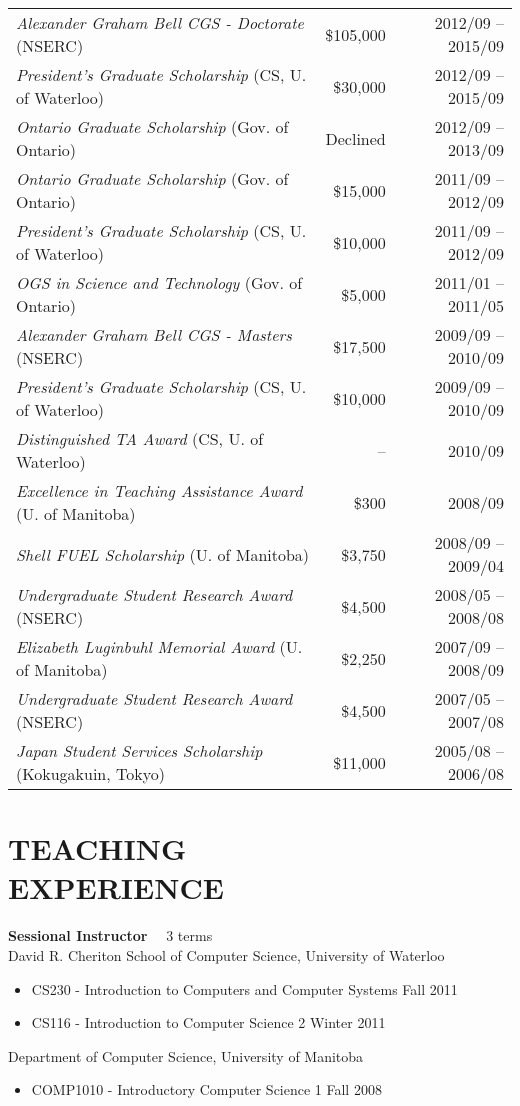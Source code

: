 \documentclass[line,margin]{res}
\begin{document}
\begin{resume}
\begin{tabular}{lrr}
{\sl Alexander Graham Bell CGS - Doctorate} (NSERC) &
\$105,000 & 2012/09 -- 2015/09 \\
{\sl President's Graduate Scholarship} (CS, U. of Waterloo) &
\$30,000 & 2012/09 -- 2015/09 \\
{\sl Ontario Graduate Scholarship} (Gov. of Ontario) & 
Declined & 2012/09 -- 2013/09 \\
{\sl Ontario Graduate Scholarship} (Gov. of Ontario) &
\$15,000 & 2011/09 -- 2012/09 \\
{\sl President's Graduate Scholarship} (CS, U. of Waterloo) &
\$10,000 & 2011/09 -- 2012/09 \\
{\sl OGS in Science and Technology} (Gov. of Ontario) &
\$5,000 & 2011/01 -- 2011/05 \\
{\sl Alexander Graham Bell CGS - Masters} (NSERC) &
\$17,500 & 2009/09 -- 2010/09 \\
{\sl President's Graduate Scholarship} (CS, U. of Waterloo) &
\$10,000 & 2009/09 -- 2010/09 \\
{\sl Distinguished TA Award} (CS, U. of Waterloo) &
-- & 2010/09 \\
{\sl Excellence in Teaching Assistance Award} (U. of Manitoba) &
\$300 & 2008/09 \\
{\sl Shell FUEL Scholarship} (U. of Manitoba) &
\$3,750 & 2008/09 -- 2009/04 \\
{\sl Undergraduate Student Research Award} (NSERC) &
\$4,500 & 2008/05 -- 2008/08 \\
{\sl Elizabeth Luginbuhl Memorial Award} (U. of Manitoba) &
\$2,250 & 2007/09 -- 2008/09 \\
{\sl Undergraduate Student Research Award} (NSERC) &
\$4,500 & 2007/05 -- 2007/08 \\
{\sl Japan Student Services Scholarship} (Kokugakuin, Tokyo) &
\$11,000 & 2005/08 -- 2006/08
\end{tabular}
\section{TEACHING \\EXPERIENCE}
  {\bf Sessional Instructor} ~~3 terms \vspace{4pt} \\
  David R. Cheriton School of Computer Science, University of Waterloo
  \begin{itemize}  \itemsep -2pt %
    \item CS230 - Introduction to Computers and Computer Systems \hfill Fall 2011
    \item CS116 - Introduction to Computer Science 2 \hfill Winter 2011
  \end{itemize} \vspace{-4pt}
  Department of Computer Science, University of Manitoba
  \begin{itemize}  \itemsep -2pt %
    \item COMP1010 - Introductory Computer Science 1 \hfill Fall 2008
  \end{itemize}
  

\end{resume}
\end{document}
